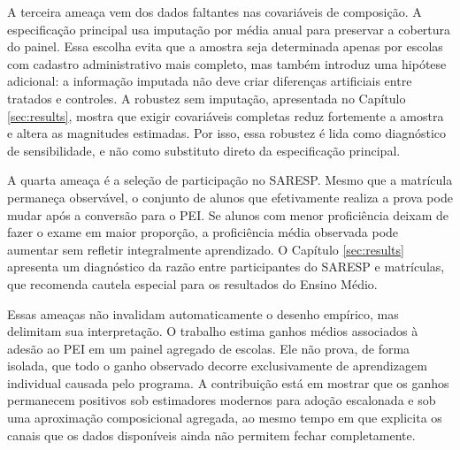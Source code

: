 A terceira ameaça vem dos dados faltantes nas covariáveis de composição. A especificação principal usa imputação por média anual para preservar a cobertura do painel. Essa escolha evita que a amostra seja determinada apenas por escolas com cadastro administrativo mais completo, mas também introduz uma hipótese adicional: a informação imputada não deve criar diferenças artificiais entre tratados e controles. A robustez sem imputação, apresentada no Capítulo \ref{sec:results}, mostra que exigir covariáveis completas reduz fortemente a amostra e altera as magnitudes estimadas. Por isso, essa robustez é lida como diagnóstico de sensibilidade, e não como substituto direto da especificação principal.

A quarta ameaça é a seleção de participação no SARESP. Mesmo que a matrícula permaneça observável, o conjunto de alunos que efetivamente realiza a prova pode mudar após a conversão para o PEI. Se alunos com menor proficiência deixam de fazer o exame em maior proporção, a proficiência média observada pode aumentar sem refletir integralmente aprendizado. O Capítulo \ref{sec:results} apresenta um diagnóstico da razão entre participantes do SARESP e matrículas, que recomenda cautela especial para os resultados do Ensino Médio.

Essas ameaças não invalidam automaticamente o desenho empírico, mas delimitam sua interpretação. O trabalho estima ganhos médios associados à adesão ao PEI em um painel agregado de escolas. Ele não prova, de forma isolada, que todo o ganho observado decorre exclusivamente de aprendizagem individual causada pelo programa. A contribuição está em mostrar que os ganhos permanecem positivos sob estimadores modernos para adoção escalonada e sob uma aproximação composicional agregada, ao mesmo tempo em que explicita os canais que os dados disponíveis ainda não permitem fechar completamente.
